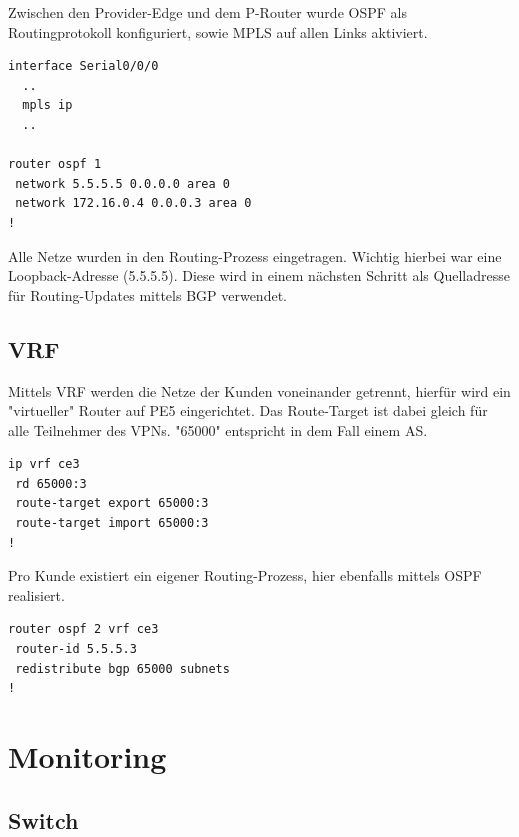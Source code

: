 Zwischen den Provider-Edge und dem P-Router wurde OSPF als Routingprotokoll konfiguriert, sowie \ac{MPLS} auf allen Links aktiviert.

\begin{lstlisting}[caption={PE5, MPLS und OSPF-Konfiguration},label={lst:mon},language={}]
interface Serial0/0/0
  ..
  mpls ip
  ..
  
router ospf 1
 network 5.5.5.5 0.0.0.0 area 0
 network 172.16.0.4 0.0.0.3 area 0
!
\end{lstlisting}

Alle Netze wurden in den Routing-Prozess eingetragen. Wichtig hierbei war eine Loopback-Adresse (5.5.5.5). Diese wird in einem nächsten Schritt als Quelladresse für Routing-Updates mittels \ac{BGP} verwendet.


\section{VRF}

Mittels \ac{VRF} werden die Netze der Kunden voneinander getrennt, hierfür wird ein "virtueller" Router auf PE5 eingerichtet. Das Route-Target ist dabei gleich für alle Teilnehmer des VPNs. "65000" entspricht in dem Fall einem \ac{AS}.

\begin{lstlisting}[caption={VRF CE3},label={lst:mon},language={}]
ip vrf ce3
 rd 65000:3
 route-target export 65000:3
 route-target import 65000:3
!
\end{lstlisting}

Pro Kunde existiert ein eigener Routing-Prozess, hier ebenfalls mittels \ac{OSPF} realisiert.

\begin{lstlisting}[caption={OSPF für CE3},label={lst:mon},language={}]
router ospf 2 vrf ce3
 router-id 5.5.5.3
 redistribute bgp 65000 subnets
!
\end{lstlisting}


\chapter{Monitoring}

\section{Switch}

